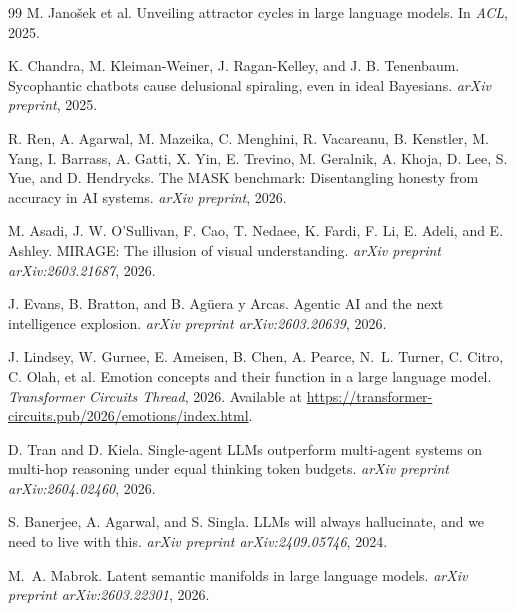 \documentclass[11pt,a4paper]{article}
\begin{document}
\begin{thebibliography}{99}
M. Jano\v{s}ek et al.
Unveiling attractor cycles in large language models.
In \textit{ACL}, 2025.

K. Chandra, M. Kleiman-Weiner, J. Ragan-Kelley, and J. B. Tenenbaum.
Sycophantic chatbots cause delusional spiraling, even in ideal Bayesians.
\textit{arXiv preprint}, 2025.

R. Ren, A. Agarwal, M. Mazeika, C. Menghini, R. Vacareanu, B. Kenstler,
M. Yang, I. Barrass, A. Gatti, X. Yin, E. Trevino, M. Geralnik, A. Khoja,
D. Lee, S. Yue, and D. Hendrycks.
The {MASK} benchmark: Disentangling honesty from accuracy in {AI} systems.
\textit{arXiv preprint}, 2026.

M. Asadi, J. W. O'Sullivan, F. Cao, T. Nedaee, K. Fardi, F. Li, E. Adeli,
and E. Ashley.
{MIRAGE}: The illusion of visual understanding.
\textit{arXiv preprint arXiv:2603.21687}, 2026.

J. Evans, B. Bratton, and B. Ag\"{u}era y Arcas.
Agentic {AI} and the next intelligence explosion.
\textit{arXiv preprint arXiv:2603.20639}, 2026.

J. Lindsey, W. Gurnee, E. Ameisen, B. Chen, A. Pearce, N.~L. Turner,
C. Citro, C. Olah, et al.
Emotion concepts and their function in a large language model.
\textit{Transformer Circuits Thread}, 2026.
Available at \url{https://transformer-circuits.pub/2026/emotions/index.html}.

D. Tran and D. Kiela.
Single-agent {LLMs} outperform multi-agent systems on multi-hop reasoning
under equal thinking token budgets.
\textit{arXiv preprint arXiv:2604.02460}, 2026.

S. Banerjee, A. Agarwal, and S. Singla.
{LLMs} will always hallucinate, and we need to live with this.
\textit{arXiv preprint arXiv:2409.05746}, 2024.

M.~A. Mabrok.
Latent semantic manifolds in large language models.
\textit{arXiv preprint arXiv:2603.22301}, 2026.

\end{thebibliography}
\end{document}
